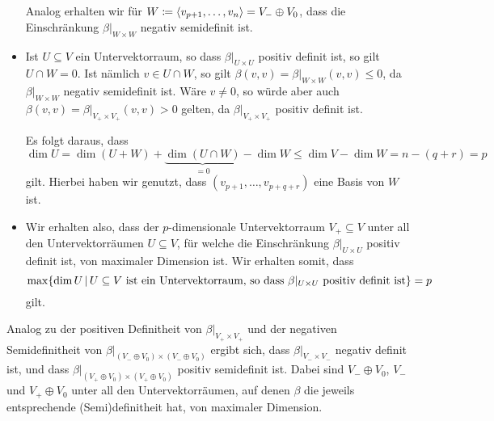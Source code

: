 \documentclass[a4paper, 10pt, numbers = noenddot]{scrartcl}
\begin{document}
\begin{itemize}
    Analog erhalten wir für $W \coloneqq \left\langle v_{p+1}, \dotsc, v_n \right\rangle = V_- \oplus V_0$, dass die Einschränkung $\beta|_{W \times W}$ negativ semidefinit ist.
    
  \item
    Ist $U \subseteq V$ ein Untervektorraum, so dass $\beta|_{U \times U}$ positiv definit ist, so gilt $U \cap W = 0$.
    Ist nämlich $v \in U \cap W$, so gilt $\beta(v, v) = \beta|_{W \times W}(v, v) \leq 0$, da $\beta|_{W \times W}$ negativ semidefinit ist.
    Wäre $v \neq 0$, so würde aber auch $\beta(v, v) = \beta|_{V_+ \times V_+}(v, v) > 0$ gelten, da $\beta|_{V_+ \times V_+}$ positiv definit ist.
   
    Es folgt daraus, dass
    \[
            \dim U
      =     \dim( U + W ) + \underbrace{ \dim( U \cap W ) }_{=0} - \dim W
      \leq  \dim V - \dim W
      =     n - (q+r)
      =     p
    \]
    gilt.
    Hierbei haben wir genutzt, dass $(v_{p+1}, \dotsc, v_{p+q+r})$ eine Basis von $W$ ist.
    
  \item
    Wir erhalten also, dass der $p$-dimensionale Untervektorraum $V_+ \subseteq V$ unter all den Untervektorräumen $U \subseteq V$, für welche die Einschränkung $\beta|_{U \times U}$ positiv definit ist, von maximaler Dimension ist.
    Wir erhalten somit, dass
    \[
        \max \{
                \dim U
              \,|\,
                \text{$U \subseteq V$ ist ein Untervektorraum, so dass $\beta|_{U \times U}$ positiv definit ist}
              \}
      = p
    \]
    gilt.
\end{itemize}

Analog zu der positiven Definitheit von $\beta|_{V_+ \times V_+}$ und der negativen Semidefinitheit von $\beta|_{(V_- \oplus V_0) \times (V_- \oplus V_0)}$ ergibt sich, dass $\beta|_{V_- \times V_-}$ negativ definit ist, und dass $\beta|_{(V_+ \oplus V_0) \times (V_+ \oplus V_0)}$ positiv semidefinit ist.
Dabei sind $V_- \oplus V_0$, $V_-$ und $V_+ \oplus V_0$ unter all den Untervektorräumen, auf denen $\beta$ die jeweils entsprechende (Semi)definitheit hat, von maximaler Dimension.






\end{document}
